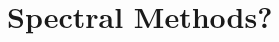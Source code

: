 \documentclass{article}
\begin{document}
\section{Spectral Methods?}




\begin{appendix}
\begin{comment}
\section{Gradient Estimator Implementation}
In the log-semiring, addition is given by $\bigoplus = \LSE$ and multiplication
by $\bigotimes = +$.
Consider the linear chain CRF, $\bigotimes_t \psi(x_{t-1}, x_t)$,
with $\psi(x_{t-1}, t) = f(x_t) \oplus g(x_{t-1},x_t)$.
We would like to compute the gradient of the
log partition function, $A = \bigoplus_x \bigotimes_t \psi(x_{t-1}, x_t)$.
Recall the gradient identities 
\begin{equation}
\begin{aligned}
\nabla_a a \bigoplus b &= \frac{\exp(a)}{\exp(a \bigoplus b)}\\
\nabla_a a \bigotimes b &= 1.
\end{aligned}
\end{equation}

We then have 
\begin{equation}
\begin{aligned}
\nabla_{\psi(x_a,x_b)} &\bigoplus_t \psi(x_{t-1}, x_t)\\
&= \nabla_{\psi(x_a,x_b)} \bigoplus_t \psi(x_{t-1}, x_t)\\
\end{aligned}
\end{equation}
\end{comment}

\end{appendix}
\end{document}
